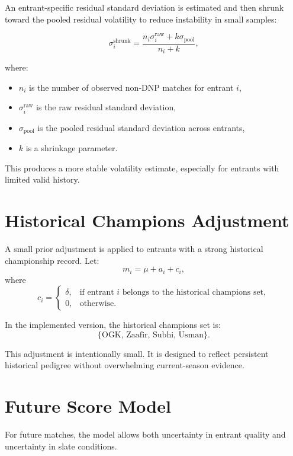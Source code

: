 \documentclass[11pt]{article}
\begin{document}
An entrant-specific residual standard deviation is estimated and then shrunk toward the pooled residual volatility to reduce instability in small samples:

\begin{equation}
\sigma_i^{\text{shrunk}}
=
\frac{n_i \sigma_i^{\text{raw}} + k \sigma_{\text{pool}}}{n_i + k},
\end{equation}

where:
\begin{itemize}[itemsep=2pt]
    \item $n_i$ is the number of observed non-DNP matches for entrant $i$,
    \item $\sigma_i^{\text{raw}}$ is the raw residual standard deviation,
    \item $\sigma_{\text{pool}}$ is the pooled residual standard deviation across entrants,
    \item $k$ is a shrinkage parameter.
\end{itemize}

This produces a more stable volatility estimate, especially for entrants with limited valid history.

\section{Historical Champions Adjustment}

A small prior adjustment is applied to entrants with a strong historical championship record. Let:
\begin{equation}
m_i = \mu + a_i + c_i,
\end{equation}
where
$$
c_i =
\begin{cases}
\delta, & \text{if entrant } i \text{ belongs to the historical champions set},\\
0, & \text{otherwise}.
\end{cases}
$$

In the implemented version, the historical champions set is:
$$
\{\text{OGK, Zaafir, Subhi, Usman}\}.
$$

This adjustment is intentionally small. It is designed to reflect persistent historical pedigree without overwhelming current-season evidence.

\section{Future Score Model}

For future matches, the model allows both uncertainty in entrant quality and uncertainty in slate conditions.
\end{document}

